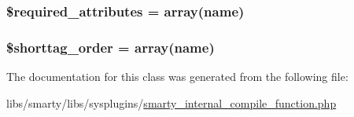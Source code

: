 \subsubsection[{\$required\+\_\+attributes}]{\setlength{\rightskip}{0pt plus 5cm}\$required\+\_\+attributes = array(\textquotesingle{}name\textquotesingle{})}\label{class_smarty___internal___compile___function_ae799507d5461de485f3a618abeecea95}
\hypertarget{class_smarty___internal___compile___function_a2ccb25269c3a92e8c4796c7ef23725e6}{}
\subsubsection[{\$shorttag\+\_\+order}]{\setlength{\rightskip}{0pt plus 5cm}\$shorttag\+\_\+order = array(\textquotesingle{}name\textquotesingle{})}\label{class_smarty___internal___compile___function_a2ccb25269c3a92e8c4796c7ef23725e6}


The documentation for this class was generated from the following file\+:\begin{DoxyCompactItemize}
\item 
libs/smarty/libs/sysplugins/\hyperlink{smarty__internal__compile__function_8php}{smarty\+\_\+internal\+\_\+compile\+\_\+function.\+php}\end{DoxyCompactItemize}
